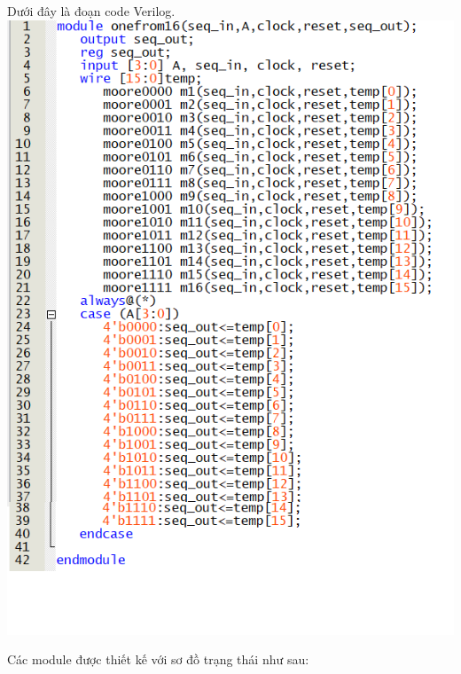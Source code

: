 \documentclass[a4paper]{article}
\begin{document}
	Dưới đây là đoạn code Verilog.\\
	\includegraphics{onefrom16.png}
	
	Các module được thiết kế với sơ đồ trạng thái như sau:
	\newpage
%	
%	
\end{document}
